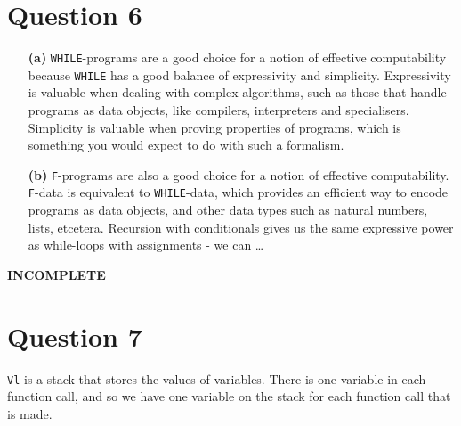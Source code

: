 \documentclass{article}
\begin{document}
\section*{Question 6}
\begin{enumerate}
    \item[\textbf{(a)}] \texttt{WHILE}-programs are a good choice for a notion of effective computability because \texttt{WHILE} has a good balance of expressivity and simplicity. Expressivity is valuable when dealing with complex algorithms, such as those that handle programs as data objects, like compilers, interpreters and specialisers. Simplicity is valuable when proving properties of programs, which is something you would expect to do with such a formalism.
    \item[\textbf{(b)}] \texttt{F}-programs are also a good choice for a notion of effective computability. \texttt{F}-data is equivalent to \texttt{WHILE}-data, which provides an efficient way to encode programs as data objects, and other data types such as natural numbers, lists, etcetera. Recursion with conditionals gives us the same expressive power as while-loops with assignments - we can \dots
\end{enumerate}

\textbf{INCOMPLETE}

\section*{Question 7}
\texttt{Vl} is a stack that stores the values of variables. There is one variable in each function call, and so we have one variable on the stack for each function call that is made.
\end{document}
